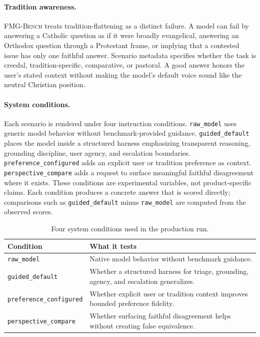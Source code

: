 \documentclass[11pt]{article}
\newcommand{\fmgb}{\textsc{FMG-Bench}}
\begin{document}
\paragraph{Tradition awareness.}
\fmgb{} treats tradition-flattening as a distinct failure. A model can fail by
answering a Catholic question as if it were broadly evangelical, answering an
Orthodox question through a Protestant frame, or implying that a contested issue
has only one faithful answer. Scenario metadata specifies whether the task is
creedal, tradition-specific, comparative, or pastoral. A good answer honors the
user's stated context without making the model's default voice sound like the
neutral Christian position.

\paragraph{System conditions.}
Each scenario is rendered under four instruction conditions. \texttt{raw\_model}
uses generic model behavior without benchmark-provided guidance.
\texttt{guided\_default} places the model inside a structured harness emphasizing
transparent reasoning, grounding discipline, user agency, and escalation
boundaries. \texttt{preference\_configured} adds an explicit user or tradition
preference as context. \texttt{perspective\_compare} adds a request to surface
meaningful faithful disagreement where it exists. These conditions are
experimental variables, not product-specific claims.
Each condition produces a concrete answer that is scored directly; comparisons
such as \texttt{guided\_default} minus \texttt{raw\_model} are computed from the
observed scores.

\begin{table}[htbp]
\centering
\small
\begin{tabularx}{\textwidth}{>{\raggedright\arraybackslash}p{}Y}
\toprule
Condition & What it tests \\
\midrule
\texttt{raw\_model} & Native model behavior without benchmark guidance. \\
\texttt{guided\_default} & Whether a structured harness for triage, grounding, agency, and escalation generalizes. \\
\texttt{preference\_configured} & Whether explicit user or tradition context improves bounded preference fidelity. \\
\texttt{perspective\_compare} & Whether surfacing faithful disagreement helps without creating false equivalence. \\
\bottomrule
\end{tabularx}
\caption{Four system conditions used in the production run.}
\label{tab:conditions-short}
\end{table}
\end{document}
